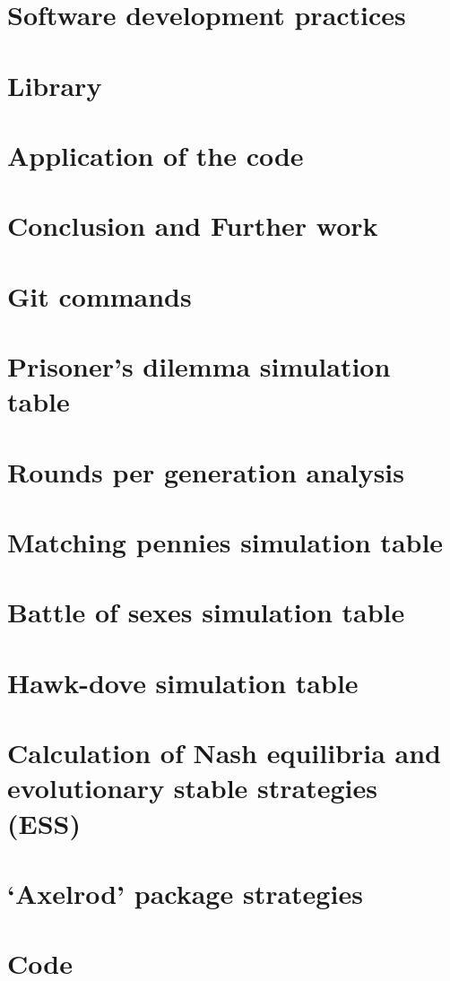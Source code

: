 \documentclass[12pt]{report}
\begin{document}
\chapter{Software development practices}


\chapter{Library}


\chapter{Application of the code}


\chapter{Conclusion and Further work}


\appendix
\chapter{Git commands}


\chapter{Prisoner's dilemma simulation table}


\chapter{Rounds per generation analysis}


\chapter{Matching pennies simulation table}


\chapter{Battle of sexes simulation table}


\chapter{Hawk-dove simulation table}


\chapter{Calculation of Nash equilibria and evolutionary stable strategies (ESS)}


\chapter{`Axelrod' package strategies}


\chapter{Code}


\newpage


\end{document}
